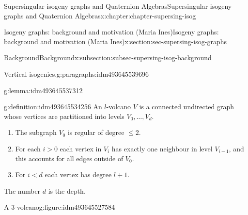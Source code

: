\documentclass[oneside,10pt,]{book}
\numberwithin{equation}{section}
\newcommand{\lt}{<}
\newcommand{\gt}{>}
\begin{document}
\begin{chapterptx}{Supersingular isogeny graphs and Quaternion Algebras}{}{Supersingular isogeny graphs and Quaternion Algebras}{}{}{x:chapter:chapter-supersing-isog}
\begin{sectionptx}{Isogeny graphs: background and motivation (Maria Ines)}{}{Isogeny graphs: background and motivation (Maria Ines)}{}{}{x:section:sec-supersing-isog-graphs}
\begin{subsectionptx}{Background}{}{Background}{}{}{x:subsection:subsec-supersing-isog-background}
\begin{paragraphs}{Vertical isogenies.}{g:paragraphs:idm493645539696}
\begin{lemma}{}{}{g:lemma:idm493645537312}
\end{lemma}
\begin{definition}{}{g:definition:idm493645534256}%
An \(l\)-volcano \(V\) is a connected undirected graph whose vertices are partitioned into levels \(V_0, \ldots, V_d\).%
\begin{enumerate}
\item{}The subgraph \(V_0\) is regular of degree \(\le 2\).%
\item{}For each \(i \gt 0\) each vertex in \(V_i\) has exactly one neighbour in level \(V_{i-1}\), and this accounts for all edges outside of \(V_0\).%
\item{}For \(i \lt d\) each vertex has degree \(l+1\).%
\end{enumerate}
The number \(d\) is the depth.%
\end{definition}
\begin{figureptx}{A \(3\)-volcano}{g:figure:idm493645527584}{}%
\begin{image}{0}{1}{0}%
\end{image}
\end{figureptx}
\end{paragraphs}
\end{subsectionptx}
\end{sectionptx}
\end{chapterptx}
\end{document}
